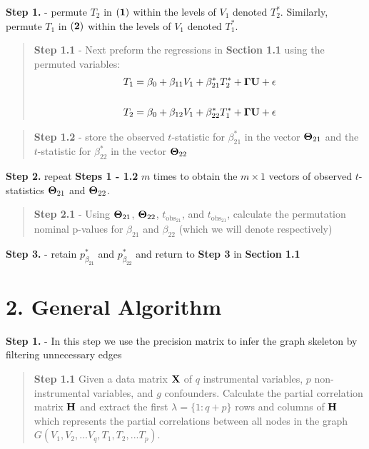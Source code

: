 \documentclass[12pt]{report}
\begin{document}
\noindent \textbf{Step 1.} - permute $T_2$ in $\bf (1)$ within the levels of $V_1$ denoted $T_2^{\ast}$. Similarly, permute $T_1$ in $\bf (2)$ within the levels of $V_1$ denoted $T_1^{\ast}$.
 
\begin{quote}
\textbf{Step 1.1} - Next preform the regressions in \textbf{Section 1.1} using the permuted variables:
\begin{eqnarray}
T_1 = \beta_0 +\beta_{11}V_1+\beta_{21}^{\ast}T_2^{\ast}+{\bf \Gamma U}+ \epsilon \\
\nonumber\\
T_2 = \beta_0 +\beta_{12}V_1+\beta_{22}^{\ast}T_1^{\ast}+{\bf \Gamma U}+ \epsilon 
\end{eqnarray}
\end{quote}

\begin{quote}
\textbf{Step 1.2} - store the observed $t$-statistic for $\beta_{21}^{\ast}$ in the vector ${\bf \Theta}_{21}$ and the $t$-statistic for $\beta_{22}^{\ast}$ in the vector ${\bf \Theta}_{22}$
\end{quote}

\noindent \textbf{Step 2.} repeat \textbf{Steps 1 - 1.2} $m$ times to obtain the $m \times 1$ vectors of observed $t$-statistics ${\bf \Theta}_{21}$ and ${\bf \Theta}_{22}$. \\

\begin{quote}
\textbf{Step 2.1} - Using ${\bf \Theta}_{21}$, ${\bf \Theta}_{22}$, $t_{\text{obs}_{21}}$, and $t_{\text{obs}_{21}}$, calculate the permutation nominal p-values for $\beta_{21}$ and $\beta_{22}$ (which we will denote  respectively)
\end{quote}

\noindent \textbf{Step 3.} - retain $p_{\beta_{21}}^{\ast}$ and $p_{\beta_{22}}^{\ast}$ and return to \textbf{Step 3} in \textbf{Section 1.1} \\


\section*{2. General Algorithm}

\textbf{Step 1.} - In this step we use the precision matrix to infer the graph skeleton by filtering unnecessary edges 

\begin{quote}
 \textbf{Step 1.1} Given a data matrix ${\bf X}$ of $q$ instrumental variables, $p$ non-instrumental variables, and $g$ confounders. Calculate the partial correlation matrix $\bf H$ and extract the first $\lambda = \{1 : q+p\}$ rows and columns of ${\bf H}$ which represents the partial correlations between all nodes in the graph $G(V_1, V_2,...V_q, T_1, T_2, ... T_p)$.
\end{quote}
\end{document}
